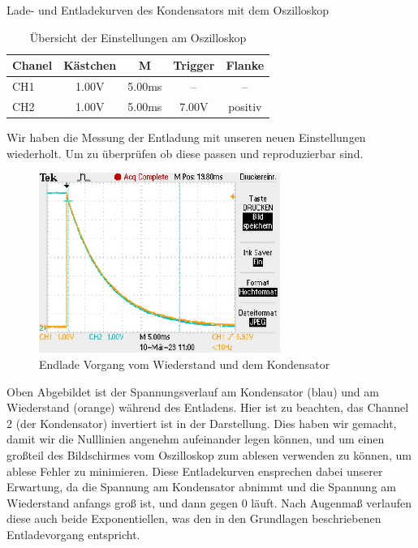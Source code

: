 \documentclass[twoside]{protokoll}
\begin{document}
\begin{aufgabe}{Lade- und Entladekurven des Kondensators mit dem Oszilloskop}
\begin{table}[H]
        \centering
        \begin{tabularx}{0.8\textwidth}{X c c c c} %
            \toprule
            \textbf{Chanel} & \textbf{Kästchen} & \textbf{M} & \textbf{Trigger} & \textbf{Flanke} \\
            \midrule
            CH1 & 1.00V & 5.00ms & -- & -- \\
            CH2 & 1.00V & 5.00ms & 7.00V & positiv \\
            \bottomrule
        \end{tabularx}
        \caption{Übersicht der Einstellungen am Oszilloskop}
        \label{tab:mytable}
    \end{table}

Wir haben die Messung der Entladung mit unseren neuen Einstellungen wiederholt. Um zu überprüfen ob diese passen und reproduzierbar sind. 
 


\begin{figure}[H]
  \centering
    \includegraphics[width=0.7\textwidth]{Bilder_Osziloskop/Entladen_Kondensator_02.pdf}
    \caption{Endlade Vorgang vom Wiederstand und dem Kondensator}
  \centering
\end{figure}
Oben Abgebildet ist der Spannungsverlauf am Kondensator (blau) und am Wiederstand (orange) während des Entladens.
Hier ist zu beachten, das Channel 2 (der Kondensator) invertiert ist in der Darstellung.
Dies haben wir gemacht, damit wir die Nulllinien angenehm aufeinander legen können, und um einen großteil des Bildschirmes vom Oszilloskop zum ablesen verwenden zu können, um ablese Fehler zu minimieren.
Diese Entladekurven ensprechen dabei unserer Erwartung, da die Spannung am Kondensator abnimmt und die Spannung am Wiederstand anfangs groß ist, und dann gegen 0 läuft.
Nach Augenmaß verlaufen diese auch beide Exponentiellen, was den in den Grundlagen beschriebenen Entladevorgang entspricht.


\end{aufgabe}
\end{document}
